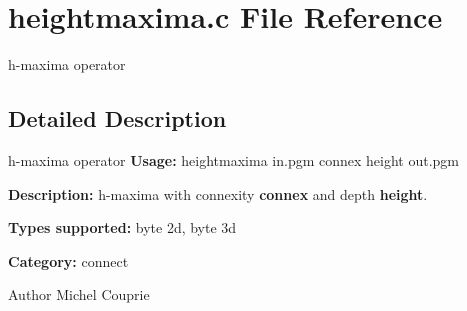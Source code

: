 \section{heightmaxima.c File Reference}
\label{heightmaxima_8c}


h-\/maxima operator  




\subsection{Detailed Description}
h-\/maxima operator {\bfseries Usage:} heightmaxima in.pgm connex height out.pgm

{\bfseries Description:} h-\/maxima with connexity {\bfseries connex} and depth {\bfseries height}.

{\bfseries Types supported:} byte 2d, byte 3d

{\bfseries Category:} connect

\begin{DoxyAuthor}{Author}
Michel Couprie 
\end{DoxyAuthor}
